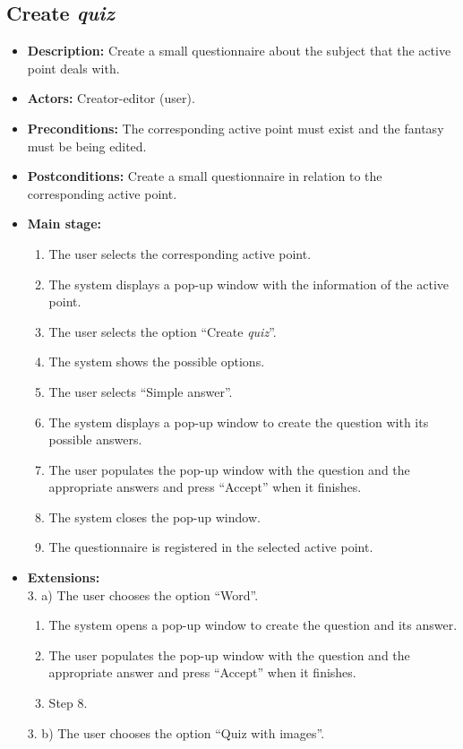 \subsection{Create \textit{quiz}}
\begin{itemize}
	\item \textbf{Description:} Create a small questionnaire about the subject that the active point deals with.
	\item \textbf{Actors:} Creator-editor (user).
	\item \textbf{Preconditions:} The corresponding active point must exist and the fantasy must be being edited.
	\item \textbf{Postconditions:} Create a small questionnaire in relation to the corresponding active point.
	\item \textbf{Main stage:}
	\begin{enumerate}
		\item The user selects the corresponding active point.
		\item The system displays a pop-up window with the information of the active point.
		\item The user selects the option ``Create \textit{quiz}''.
		\item The system shows the possible options.
		\item The user selects ``Simple answer''.
		\item The system displays a pop-up window to create the question with its possible answers.
		\item The user populates the pop-up window with the question and the appropriate answers and press ``Accept'' when it finishes.
		\item The system closes the pop-up window.
		\item The questionnaire is registered in the selected active point.
	\end{enumerate}
	\item \textbf{Extensions:} \\3. a) The user chooses the option ``Word''.
	\begin{enumerate}
		\item The system opens a pop-up window to create the question and its answer.
		\item The user populates the pop-up window with the question and the appropriate answer and press ``Accept'' when it finishes.
		\item Step 8.
	\end{enumerate}
	3. b) The user chooses the option ``Quiz with images''.

\end{itemize}
